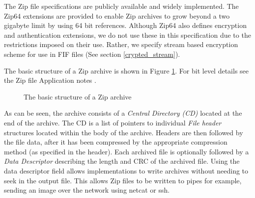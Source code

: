 \documentclass[10pt, conference]{IEEEtran}
\begin{document}
The Zip file specifications are publicly available and widely
implemented. The Zip64 extensions are provided to enable Zip archives
to grow beyond a two gigabyte limit by using 64 bit
references. Although Zip64 also defines encryption and authentication
extensions, we do not use these in this specification due to the
restrictions imposed on their use. Rather, we specify stream based
encryption scheme for use in FIF files (See section
\ref{crypted_stream}).

The basic structure of a Zip archive is shown in Figure
\ref{zip_structure}. For bit level details see the Zip file
Application notes \cite{zipspecs}.

\begin{figure}[tb]
  \begin{center}
  \mbox{\columnwidth {}}
  \caption{The basic structure of a Zip archive}
  \label{zip_structure}
  \end{center}
\end{figure}

As can be seen, the archive consists of a {\em Central Directory (CD)}
located at the end of the archive. The CD is a list of pointers to
individual {\em File header} structures located within the body of the
archive. Headers are then followed by the file data, after it has been
compressed by the appropriate compression method (as specified in the
header). Each archived file is optionally followed by a {\em Data
Descriptor} describing the length and CRC of the archived file. Using
the data descriptor field allows implementations to write archives
without needing to seek in the output file. This allows Zip files to
be written to pipes for example, sending an image over the network
using netcat or ssh.
\end{document}
